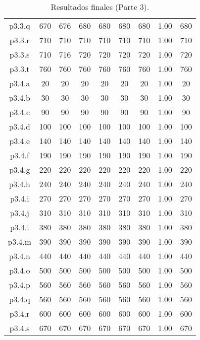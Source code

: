 \begin{table}
\begin{center}
\begin{tabular}{ |c|c|c|c|c|c|c|c|c| }
p3.3.q & 670 & 676 & 680 & 680 & 680 & 680 & 1.00 & 680  \\
p3.3.r & 710 & 710 & 710 & 710 & 710 & 710 & 1.00 & 710  \\
p3.3.s & 710 & 716 & 720 & 720 & 720 & 720 & 1.00 & 720  \\
p3.3.t & 760 & 760 & 760 & 760 & 760 & 760 & 1.00 & 760  \\
p3.4.a & 20 & 20 & 20 & 20 & 20 & 20 & 1.00 & 20  \\
p3.4.b & 30 & 30 & 30 & 30 & 30 & 30 & 1.00 & 30  \\
p3.4.c & 90 & 90 & 90 & 90 & 90 & 90 & 1.00 & 90  \\
p3.4.d & 100 & 100 & 100 & 100 & 100 & 100 & 1.00 & 100  \\
p3.4.e & 140 & 140 & 140 & 140 & 140 & 140 & 1.00 & 140  \\
p3.4.f & 190 & 190 & 190 & 190 & 190 & 190 & 1.00 & 190  \\
p3.4.g & 220 & 220 & 220 & 220 & 220 & 220 & 1.00 & 220  \\
p3.4.h & 240 & 240 & 240 & 240 & 240 & 240 & 1.00 & 240  \\
p3.4.i & 270 & 270 & 270 & 270 & 270 & 270 & 1.00 & 270  \\
p3.4.j & 310 & 310 & 310 & 310 & 310 & 310 & 1.00 & 310  \\
p3.4.l & 380 & 380 & 380 & 380 & 380 & 380 & 1.00 & 380  \\
p3.4.m & 390 & 390 & 390 & 390 & 390 & 390 & 1.00 & 390  \\
p3.4.n & 440 & 440 & 440 & 440 & 440 & 440 & 1.00 & 440  \\
p3.4.o & 500 & 500 & 500 & 500 & 500 & 500 & 1.00 & 500  \\
p3.4.p & 560 & 560 & 560 & 560 & 560 & 560 & 1.00 & 560  \\
p3.4.q & 560 & 560 & 560 & 560 & 560 & 560 & 1.00 & 560  \\
p3.4.r & 600 & 600 & 600 & 600 & 600 & 600 & 1.00 & 600  \\
p3.4.s & 670 & 670 & 670 & 670 & 670 & 670 & 1.00 & 670  \\
\hline
\end{tabular}
\end{center}
\caption{Resultados finales (Parte 3).}
\label{tab:resultadosFinales3}
\end{table}




